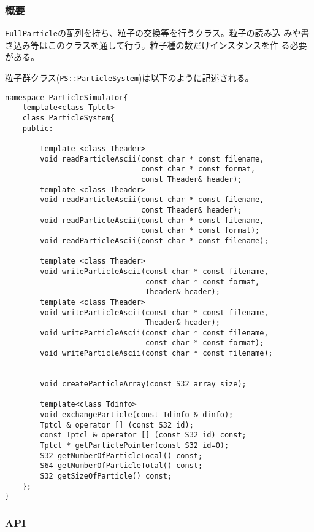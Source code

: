 
\subsubsection{概要}

{\tt FullParticle}の配列を持ち、粒子の交換等を行うクラス。粒子の読み込
みや書き込み等はこのクラスを通して行う。粒子種の数だけインスタンスを作
る必要がある。

粒子群クラス({\tt PS::ParticleSystem})は以下のように記述される。

\begin{lstlisting}[caption=粒子群クラス]
namespace ParticleSimulator{
    template<class Tptcl>
    class ParticleSystem{
    public:

        template <class Theader>
        void readParticleAscii(const char * const filename,
                               const char * const format,
                               const Theader& header);
        template <class Theader>
        void readParticleAscii(const char * const filename,
                               const Theader& header);
        void readParticleAscii(const char * const filename,
                               const char * const format);
        void readParticleAscii(const char * const filename);

        template <class Theader>
        void writeParticleAscii(const char * const filename,
                                const char * const format,
                                Theader& header);
        template <class Theader>
        void writeParticleAscii(const char * const filename,
                                Theader& header);
        void writeParticleAscii(const char * const filename,
                                const char * const format);
        void writeParticleAscii(const char * const filename);


        void createParticleArray(const S32 array_size);

        template<class Tdinfo>
        void exchangeParticle(const Tdinfo & dinfo);
        Tptcl & operator [] (const S32 id);
        const Tptcl & operator [] (const S32 id) const;
        Tptcl * getParticlePointer(const S32 id=0);
        S32 getNumberOfParticleLocal() const;
        S64 getNumberOfParticleTotal() const;
        S32 getSizeOfParticle() const;
    };
}
\end{lstlisting}

\subsubsection{API}

